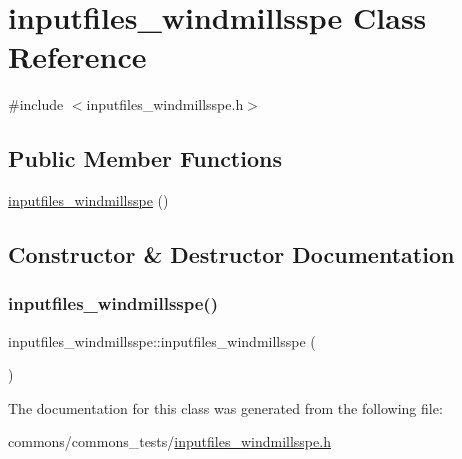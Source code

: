 \hypertarget{classinputfiles__windmillsspe}{}\section{inputfiles\+\_\+windmillsspe Class Reference}
\label{classinputfiles__windmillsspe}


{\ttfamily \#include $<$inputfiles\+\_\+windmillsspe.\+h$>$}

\subsection*{Public Member Functions}
\begin{DoxyCompactItemize}
\item 
\mbox{\hyperlink{classinputfiles__windmillsspe_a5f3983b848c9deb03c8d77f413a1d5bd}{inputfiles\+\_\+windmillsspe}} ()
\end{DoxyCompactItemize}


\subsection{Constructor \& Destructor Documentation}
\mbox{\label{classinputfiles__windmillsspe_a5f3983b848c9deb03c8d77f413a1d5bd}} 
\subsubsection{\texorpdfstring{inputfiles\_windmillsspe()}{inputfiles\_windmillsspe()}}
{\footnotesize\ttfamily inputfiles\+\_\+windmillsspe\+::inputfiles\+\_\+windmillsspe (\begin{DoxyParamCaption}{ }\end{DoxyParamCaption})}



The documentation for this class was generated from the following file\+:\begin{DoxyCompactItemize}
\item 
commons/commons\+\_\+tests/\mbox{\hyperlink{inputfiles__windmillsspe_8h}{inputfiles\+\_\+windmillsspe.\+h}}\end{DoxyCompactItemize}
